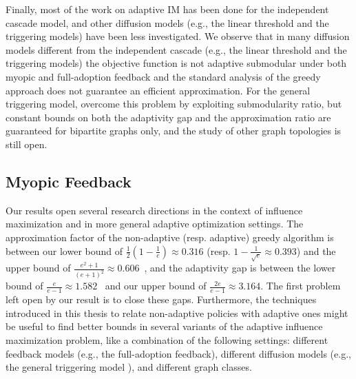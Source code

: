 Finally, most of the work on adaptive IM has been done for the independent cascade model, and other diffusion models (e.g., the linear threshold and the triggering models) have been less investigated. We observe that in many diffusion models different from the independent cascade (e.g., the linear threshold and the triggering models) the objective function is not adaptive submodular under both myopic and full-adoption feedback and the standard analysis of the greedy approach does not guarantee an efficient approximation. For the general triggering model, \cite{Fujii2019} overcome this problem by exploiting submodularity ratio, but constant bounds on both the adaptivity gap and the approximation ratio are guaranteed for bipartite graphs only, and the study of other graph topologies is still open.

\subsection{Myopic Feedback}\label{myo}



Our results open several research directions in the context of influence maximization and in more general adaptive optimization settings. The approximation factor of the non-adaptive (resp. adaptive) greedy algorithm is 
between our lower bound of $\frac{1}{2}\left(1-\frac{1}{e}\right) \approx 0.316$ (resp. $1-\frac{1}{\sqrt{e}}\approx 0.393$) and
the upper bound of $\frac{e^2+1}{(e+1)^2}\approx 0.606$~\cite{Peng2019}, and the adaptivity gap is between the lower bound of $\frac{e}{e-1}\approx 1.582$~\cite{Peng2019} and our upper bound of $\frac{2e}{e-1}\approx 3.164$. The first problem left open by our result is to close these gaps. Furthermore, the techniques introduced in this thesis to relate non-adaptive policies with adaptive ones might be useful to find better bounds in several variants of the adaptive influence maximization problem, like a combination of the following settings: different feedback models (e.g., the full-adoption feedback), different diffusion models (e.g., the general triggering model \cite{Kempe2003}), and different graph classes. 

